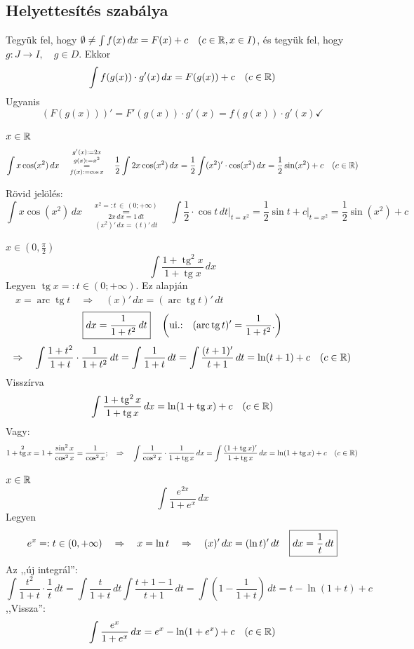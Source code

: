 \documentclass[a4paper,11.5pt]{article}
\DeclareMathOperator{\tg}{tg}
\DeclareMathOperator{\arc}{arc}
\begin{document}
	\subsection{Helyettesítés szabálya}
	\begin{revision}
		Tegyük fel, hogy $\emptyset\not=\int f(x)\,dx=F(x)+c\quad (c\in\mathbb{R}, x\in I)$, és tegyük fel, hogy\\ $g:J\to I, \quad g\in D.$ Ekkor
		\[ \int f(g(x))\cdot g'(x)\,dx=F(g(x))+c\quad (c\in\mathbb{R}) \]
		Ugyanis
		\[ (F(g(x)))'=F'(g(x))\cdot g'(x)=f(g(x))\cdot g'(x)\checkmark \]
	\end{revision}
	\begin{task}$x\in\mathbb{R}$
		\[ \int x\cos(x^2)\,dx\quad \overset{g'(x):=2x}{\overset{g(x):=x^2}{\underset{f(x):=\cos x}{=}}}\quad \frac{1}{2}\int 2x\cos(x^2)\,dx=\frac{1}{2}\int(x^2)'\cdot\cos(x^2)\,dx=\frac{1}{2}\sin(x^2)+c\quad (c\in\mathbb{R}) \]
	\end{task}
	\begin{note}
		Rövid jelölés: 
		\[ \int x\cos(x^2)\,dx\quad \overset{x^2=:t\,\in\,(0;+\infty)}{\underset{(x^2)'\,dx=(t)'\,dt}{\underset{2x\,dx=1\,dt}{=}}}\quad\int\frac{1}{2}\cdot\cos t\,dt\big|_{t=x^2}=\frac{1}{2}\sin t +c\big|_{t=x^2}=\frac{1}{2}\sin(x^2)+c  \]
	\end{note}
	\begin{task}$x\in(0,\frac{\pi}{2})$
		\[ \int\frac{1+\tg^2x}{1+\tg x}\,dx \]
		Legyen  \quad $\tg x=:t\in(0;+\infty).$ \quad Ez alapján $\quad  x=\arc\tg t\quad \Rightarrow\quad (x)'\,dx=(\arc\tg t)'\,dt$
		\[ \text{\fbox{$\displaystyle dx=\frac{1}{1+t^2}\,dt$}} \quad \left(\text{ui.:\quad }(\arc\tg t)'=\frac{1}{1+t^2}.\right)\]
		\[ \Rightarrow\quad \int\frac{1+t^2}{1+t}\cdot\frac{1}{1+t^2}\,dt=\int\frac{1}{1+t}\,dt=\int\frac{(t+1)'}{t+1}\,dt=\ln(t+1)+c\quad (c\in\mathbb{R}) \]
		Visszírva
		\[ \int\frac{1+\tg^2 x}{1+\tg x}\,dx=\ln(1+\tg x)+c\quad (c\in\R) \]
		Vagy:
		\[ 1+\tg^2 x=1+\frac{\sin^2x}{\cos^2x}=\frac{1}{\cos^2x};\quad \Rightarrow\quad \int\frac{1}{\cos^2x}\cdot\frac{1}{1+\tg x}\,dx=\int\frac{(1+\tg x)'}{1+\tg x}\,dx=\ln(1+\tg x)+c\quad (c\in\R) \]
	\end{task}
	\begin{task}$x\in\mathbb{R}$
		\[ \int\frac{e^{2x}}{1+e^x}\,dx \]
		Legyen \[e^x=:t\in(0,+\infty)\quad \Rightarrow\quad x=\ln t\quad \Rightarrow\quad (x)'\,dx=(\ln t)'\,dt\quad \text{\fbox{$\displaystyle dx=\frac{1}{t}\,dt$}} \]
		Az ,,új integrál'':\quad \[\displaystyle \int\frac{t^2}{1+t}\cdot\frac{1}{t}\,dt=\int\frac{t}{1+t}\,dt\int\frac{t+1-1}{t+1}\,dt=\int\left(1-\frac{1}{1+t}\right)\,dt=t-\ln(1+t)+c \]
		,,Vissza'':
		\[ \int\frac{e^x}{1+e^x}\,dx=e^x-\ln(1+e^x)+c\quad (c\in\mathbb{R}) \]
	\end{task}
\end{document}
